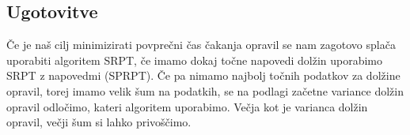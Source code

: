 \documentclass[a4paper, pt14]{article}
\begin{document}
\subsection{Ugotovitve}
Če je naš cilj minimizirati povprečni čas čakanja opravil se nam zagotovo splača uporabiti algoritem SRPT, če imamo dokaj točne napovedi dolžin uporabimo SRPT z napovedmi (SPRPT). Če pa nimamo najbolj točnih podatkov za dolžine opravil, torej imamo velik šum na podatkih, se na podlagi začetne variance dolžin opravil odločimo, kateri algoritem uporabimo. Večja kot je varianca dolžin opravil, večji šum si lahko privoščimo.
 
\end{document}
